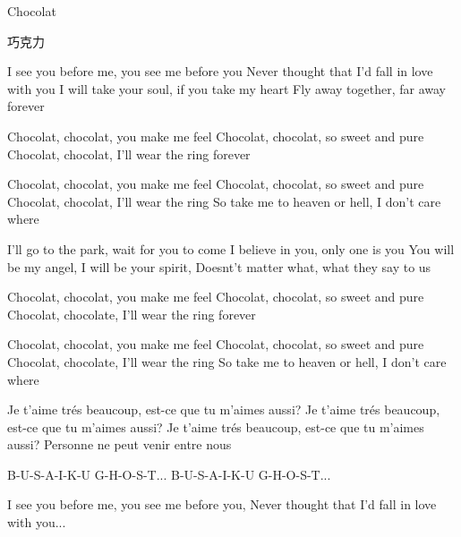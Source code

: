 \begin{paracol}{2}

    \setlength{\columnsep}{3em}
    \setlength{\columnseprule}{0.1pt}

    {\Huge Chocolat}

    \vspace{2em}

    \switchcolumn

    {\Huge 巧克力}

    \vspace{2em}

    \switchcolumn*

    \bgroup\obeylines

        I see you before me, you see me before you
        Never thought that I'd fall in love with you
        I will take your soul, if you take my heart
        Fly away together, far away forever

        Chocolat, chocolat, you make me feel
        Chocolat, chocolat, so sweet and pure
        Chocolat, chocolat, I'll wear the ring forever

        Chocolat, chocolat, you make me feel
        Chocolat, chocolat, so sweet and pure
        Chocolat, chocolat, I'll wear the ring
        So take me to heaven or hell, I don't care where

        I'll go to the park, wait for you to come
        I believe in you, only one is you
        You will be my angel, I will be your spirit,
        Doesnt't matter what, what they say to us

        Chocolat, chocolat, you make me feel
        Chocolat, chocolat, so sweet and pure
        Chocolat, chocolate, I'll wear the ring forever

        Chocolat, chocolat, you make me feel
        Chocolat, chocolat, so sweet and pure
        Chocolat, chocolate, I'll wear the ring
        So take me to heaven or hell, I don't care where

        Je t'aime trés beaucoup, est-ce que tu m'aimes aussi?
        Je t'aime trés beaucoup, est-ce que tu m'aimes aussi?
        Je t'aime trés beaucoup, est-ce que tu m'aimes aussi?
        Personne ne peut venir entre nous

        B-U-S-A-I-K-U G-H-O-S-T...
        B-U-S-A-I-K-U G-H-O-S-T...

        I see you before me, you see me before you,
        Never thought that I'd fall in love with you...



\end{paracol}

